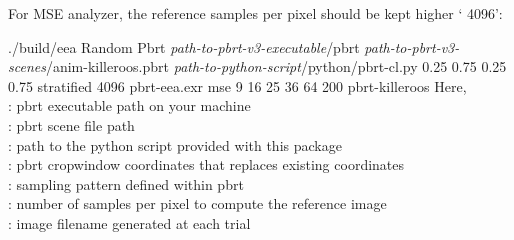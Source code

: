 For MSE analyzer, the reference samples per pixel should be kept higher ` 4096':
%
\begin{tcolorbox}
./build/eea   Random 
  Pbrt 
 \emph{path-to-pbrt-v3-executable}/pbrt 
 \emph{path-to-pbrt-v3-scenes}/anim-killeroos.pbrt 
 \emph{path-to-python-script}/python/pbrt-cl.py 
 0.25 0.75 0.25 0.75 
 stratified
 4096
 pbrt-eea.exr 
  mse  9 16 25 36 64  200 
  pbrt-killeroos
\tcblower
Here, \\
: pbrt executable path on your machine \\
: pbrt scene file path \\
: path to the python script provided with this package \\
: pbrt cropwindow coordinates that replaces existing coordinates \\
: sampling pattern defined within pbrt \\
: number of samples per pixel to compute the reference image \\
: image filename generated at each trial 
\end{tcolorbox}
%
%
